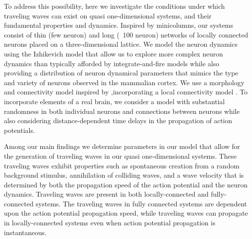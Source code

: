 \documentclass[12pt]{article}
\begin{document}
To address this possibility, here we investigate the conditions under which traveling waves can exist on quasi one-dimensional systems, and their fundamental properties and dynamics.  
Inspired by minicolumns, our systems consist of thin (few neuron) and long (~100 neuron) networks of locally connected neurons placed on a three-dimensional lattice.  
We model the neuron dynamics using the Izhikevich model \parencite{izhikevich2003} that allow us to explore more complex neuron dynamics than typically afforded by integrate-and-fire models \parencite{keane2015}\parencite{Senk2020} \color{red}while also providing a distribution of neuron dynamical parameters that mimics the type and variety of neurons observed in the mammalian cortex\color{black}.
\color{red}We use a morphology and connectivity model inspired by \parencite{maass2002},incorporating a local connectivity model \parencite{Levy2012}\parencite{Pyle2017}\parencite{Fino2011}\color{black}.
To incorporate elements of a real brain, we consider \color{red}a model with substantial randomness in both individual neurons and connections between neurons while also considering \color{black} distance-dependent time delays in the propagation of action potentials.

Among our main findings we determine parameters in our model that allow for the generation of traveling waves in our quasi one-dimensional systems. 
These traveling waves exhibit properties such as spontaneous creation from a random background stimulus, annihilation of colliding waves, and a wave velocity that is determined by both the propagation speed of the action potential and the neuron dynamics.
Traveling waves are present in both locally-connected and fully-connected systems. 
The traveling waves in fully connected systems are dependent upon the action potential propagation speed, while traveling waves can propagate in locally-connected systems even when action potential propagation is instantaneous.
\end{document}
